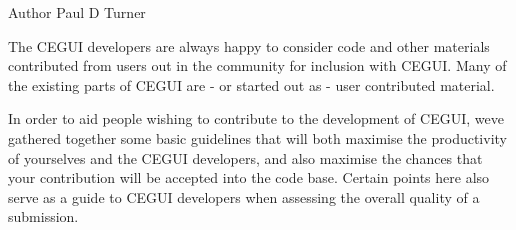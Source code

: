 \begin{DoxyAuthor}{Author}
Paul D Turner
\end{DoxyAuthor}
The C\+E\+G\+UI developers are always happy to consider code and other materials contributed from users out in the community for inclusion with C\+E\+G\+UI. Many of the existing parts of C\+E\+G\+UI are -\/ or started out as -\/ user contributed material.

In order to aid people wishing to contribute to the development of C\+E\+G\+UI, we\textquotesingle{}ve gathered together some basic guidelines that will both maximise the productivity of yourselves and the C\+E\+G\+UI developers, and also maximise the chances that your contribution will be accepted into the code base. Certain points here also serve as a guide to C\+E\+G\+UI developers when assessing the overall quality of a submission.


